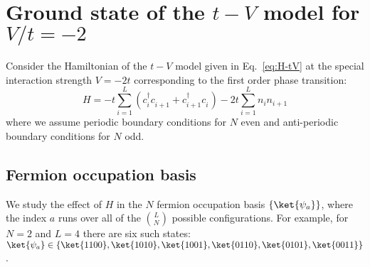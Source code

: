\section{Ground state of the $t-V$ model for $V/t = -2$}
\label{Appendix:flatState}
Consider the Hamiltonian of the $t-V$ model given in Eq.~\eqref{eq:H-tV} at the special interaction strength $V=-2t$ corresponding to the first order phase transition:
%
\begin{equation}
    H = -t \sum_{i=1}^L (c_{i}^\dagger c_{i+1}^{\phantom{\dagger}} + c_{i+1}^\dagger c_{i}^{\phantom{\dagger}}) -2t \sum_{i=1}^L n_i n_{i+1}
\end{equation}
%
where we assume periodic boundary conditions for $N$ even and anti-periodic
boundary conditions for $N$ odd.  

\subsection{Fermion occupation basis}

We study the effect of $H$ in the $N$ fermion occupation basis $\{\ket{\psi_a}\}$, where the index $a$ runs over all of the $L\choose N$ possible configurations.  For example, for $N=2$ and $L=4$ there are six such states: $\ket{\psi_a} \in \{\ket{1100}, \ket{1010}, \ket{1001}, \ket{0110}, \ket{0101}, \ket{0011}\}$. 

